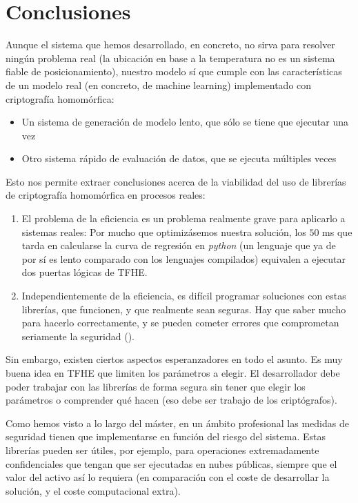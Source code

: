 \chapter{Conclusiones}
\label{chap:conclusiones}

Aunque el sistema que hemos desarrollado, en concreto, no sirva para resolver ningún problema real (la ubicación en base a la temperatura no es un sistema fiable de posicionamiento), nuestro modelo sí que cumple con las características de un modelo real (en concreto, de machine learning) implementado con criptografía homomórfica: 

\begin{itemize}
    \item Un sistema de generación de modelo lento, que sólo se tiene que ejecutar una vez
    \item Otro sistema rápido de evaluación de datos, que se ejecuta múltiples veces
\end{itemize}

Esto nos permite extraer conclusiones acerca de la viabilidad del uso de librerías de criptografía homomórfica en procesos reales:

\begin{enumerate}
    \item El problema de la eficiencia es un problema realmente grave para aplicarlo a sistemas reales: Por mucho que optimizásemos nuestra solución, los $50$ ms que tarda en calcularse la curva de regresión en \textit{python} (un lenguaje que ya de por sí es lento comparado con los lenguajes compilados) equivalen a ejecutar dos puertas lógicas de TFHE.
    \item Independientemente de la eficiencia, es difícil programar soluciones con estas librerías, que funcionen, y que realmente sean seguras. Hay que saber mucho para hacerlo correctamente, y se pueden cometer errores que comprometan seriamente la seguridad (\cite{peng_danger_2019}).
\end{enumerate}

Sin embargo, existen ciertos aspectos esperanzadores en todo el asunto. Es muy buena idea en TFHE que limiten los parámetros a elegir. El desarrollador debe poder trabajar con las librerías de forma segura sin tener que elegir los parámetros o comprender qué hacen (eso debe ser trabajo de los criptógrafos).

Como hemos visto a lo largo del máster, en un ámbito profesional las medidas de seguridad tienen que implementarse en función del riesgo del sistema. Estas librerías pueden ser útiles, por ejemplo, para operaciones extremadamente confidenciales que tengan que ser ejecutadas en nubes públicas, siempre que el valor del activo así lo requiera (en comparación con el coste de desarrollar la solución, y el coste computacional extra).


